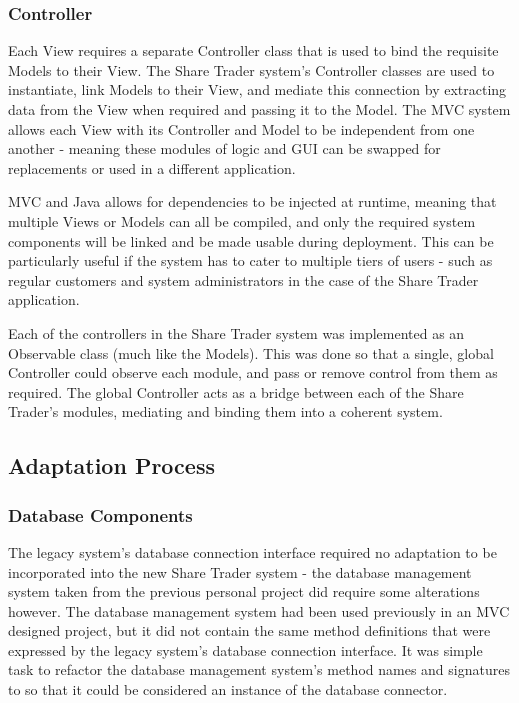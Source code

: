 \documentclass[12pt, a4paper,titlepage]{article}
\begin{document}
\subsubsection{Controller}
Each View requires a separate Controller class that is used to bind the
requisite Models to their View. 
The Share Trader system's Controller classes are used to instantiate, link
Models to their View, and mediate this connection by extracting data from the
View when required and passing it to the Model. 
The MVC system allows each View with its Controller and Model to be independent
from one another - meaning these modules of logic and GUI can be
swapped for replacements or used in a different application.

MVC and Java allows for dependencies to be injected at runtime, meaning that
multiple Views or Models can all be compiled, and only the required system
components will be linked and be made usable during deployment. 
This can be particularly useful if the system has to cater to multiple tiers
of users - such as regular customers and system administrators in the case of
the Share Trader application.

Each of the controllers in the Share Trader system was implemented as an
Observable class (much like the Models). 
This was done so that a single, global Controller could observe each module,
and pass or remove control from them as required. 
The global Controller acts as a bridge between each of the Share Trader's
modules, mediating and binding them into a coherent system.

\subsection{Adaptation Process}
\subsubsection{Database Components}
The legacy system's database connection interface required no adaptation to be
incorporated into the new Share Trader system - the database management system
taken from the previous personal project did require some alterations however.
The database management system had been used previously in an MVC designed
project, but it did not contain the same method definitions that were
expressed by the legacy system’s database connection interface. 
It was simple task to refactor the database management system's method names
and signatures to so that it could be considered an instance of the database
connector.
\end{document}
